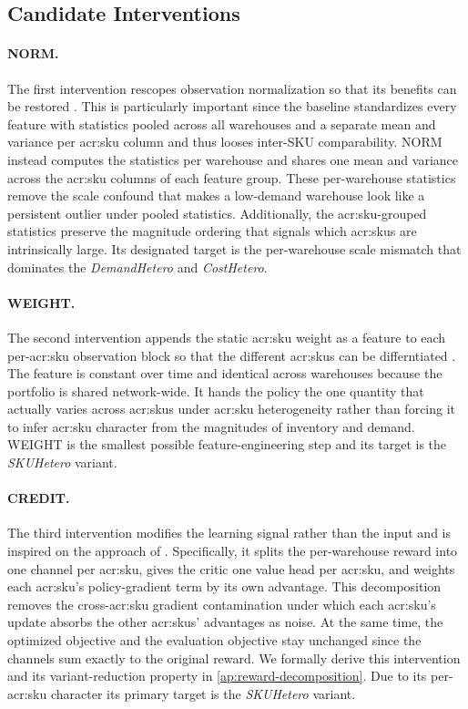 \subsection{Candidate Interventions}
\label{subsec:intervention-design}

\paragraph{\textbf{NORM.}} The first intervention rescopes observation
normalization so that its benefits can be restored \citep{andrychowicz2020matters}. This is particularly important since the baseline standardizes every feature with statistics pooled
across all warehouses and a separate mean and variance per \gls{acr:sku} column and thus looses inter-SKU comparability. NORM instead computes the statistics per warehouse and shares one mean and variance across the \gls{acr:sku} columns of each feature group. These per-warehouse statistics remove the scale confound that makes a low-demand warehouse look like a persistent outlier under pooled statistics. Additionally, the \gls{acr:sku}-grouped statistics preserve the magnitude ordering that signals which \glspl{acr:sku} are intrinsically large. Its designated target is the per-warehouse scale mismatch that dominates
the \textit{DemandHetero} and \textit{CostHetero}.

\paragraph{\textbf{WEIGHT.}} The second intervention appends the static \gls{acr:sku} weight as a feature to each per-\gls{acr:sku} observation block so that the different \glspl{acr:sku} can be differntiated \citep{terry2020revisiting}. The feature is constant over time and identical across warehouses because
the portfolio is shared network-wide. It hands the policy the one quantity that
actually varies across \glspl{acr:sku} under \gls{acr:sku} heterogeneity rather
than forcing it to infer \gls{acr:sku} character from the magnitudes of inventory and demand. WEIGHT is the smallest possible feature-engineering step and its target is the \textit{SKUHetero} variant.

\paragraph{\textbf{CREDIT.}} The third intervention modifies the learning
signal rather than the input and is inspired on the approach of \citep{van2017hybrid}. Specifically, it splits the per-warehouse reward into one channel per \gls{acr:sku}, gives the critic one value head per \gls{acr:sku}, and weights each \gls{acr:sku}'s policy-gradient term by its own advantage. This decomposition removes the cross-\gls{acr:sku} gradient contamination under which each \gls{acr:sku}'s update absorbs the other \glspl{acr:sku}' advantages as noise. At the same time, the optimized objective and the evaluation objective stay unchanged since the channels sum exactly to the original reward. We formally derive this intervention and its variant-reduction property in \autoref{ap:reward-decomposition}. Due to its per-\gls{acr:sku} character its primary target is the \textit{SKUHetero} variant.

